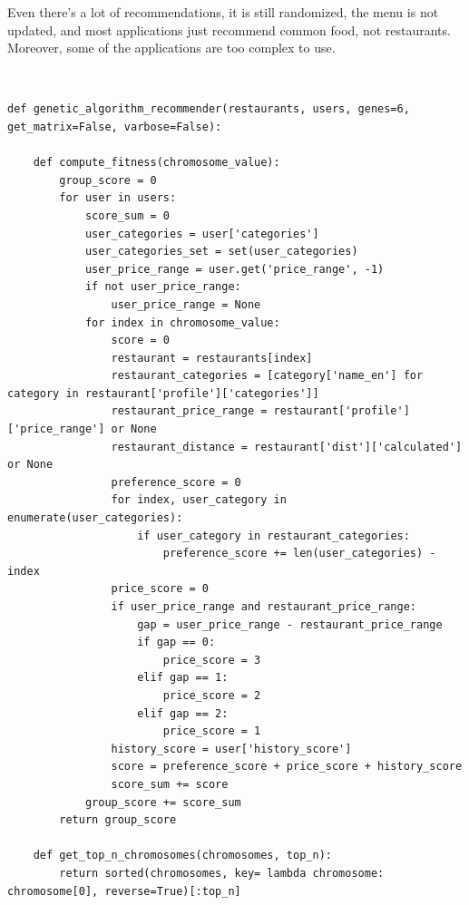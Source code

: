 \documentclass[12pt,oneside,openright,a4paper]{cpe-english-project}
\begin{document}
Even there’s a lot of recommendations, it is still randomized, the menu is not updated, and most applications just recommend common food, not restaurants. Moreover, some of the applications are too complex to use.




 \\

\begin{lstlisting}
def genetic_algorithm_recommender(restaurants, users, genes=6, get_matrix=False, varbose=False):

    def compute_fitness(chromosome_value):
        group_score = 0
        for user in users:
            score_sum = 0
            user_categories = user['categories']
            user_categories_set = set(user_categories)
            user_price_range = user.get('price_range', -1)
            if not user_price_range:
                user_price_range = None
            for index in chromosome_value:
                score = 0
                restaurant = restaurants[index]
                restaurant_categories = [category['name_en'] for category in restaurant['profile']['categories']]
                restaurant_price_range = restaurant['profile']['price_range'] or None
                restaurant_distance = restaurant['dist']['calculated'] or None
                preference_score = 0
                for index, user_category in enumerate(user_categories):
                    if user_category in restaurant_categories:
                        preference_score += len(user_categories) - index
                price_score = 0
                if user_price_range and restaurant_price_range:
                    gap = user_price_range - restaurant_price_range
                    if gap == 0:
                        price_score = 3
                    elif gap == 1:
                        price_score = 2
                    elif gap == 2:
                        price_score = 1
                history_score = user['history_score']
                score = preference_score + price_score + history_score
                score_sum += score
            group_score += score_sum
        return group_score

    def get_top_n_chromosomes(chromosomes, top_n):
        return sorted(chromosomes, key= lambda chromosome: chromosome[0], reverse=True)[:top_n]


\end{lstlisting}
\end{document}
